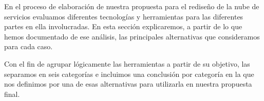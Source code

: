 En el proceso de elaboración de nuestra propuesta para el rediseño de la nube de servicios evaluamos diferentes tecnologías y herramientas para las diferentes partes en ella involucradas. En esta sección explicaremos, a partir de lo que hemos documentado de ese análisis, las principales alternativas que consideramos para cada caso.

Con el fin de agrupar lógicamente las herramientas a partir de su objetivo, las separamos en seis categorías e incluimos una conclusión por categoría en la que nos definimos por una de esas alternativas para utilizarla en nuestra propuesta final.
